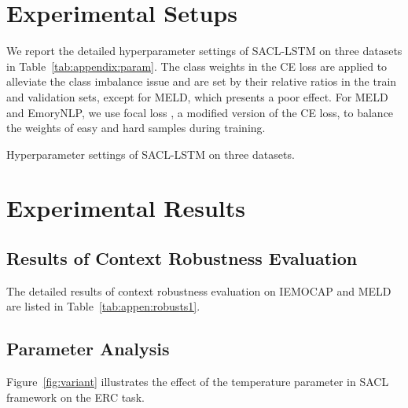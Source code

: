 \documentclass[11pt]{article}
\begin{document}
\section{Experimental Setups}  \label{sec:appendix:setups}
We report the detailed hyperparameter settings of SACL-LSTM on three datasets in Table~\ref{tab:appendix:param}.
The class weights in the CE loss are applied to alleviate the class imbalance issue and are set by their relative ratios in the train and validation sets, except for MELD, which presents a poor effect.
For MELD and EmoryNLP, we use focal loss \citep{DBLP:conf/iccv/LinGGHD17}, a modified version of the CE loss, to balance the weights of easy and hard samples during training.

\begin{table}[t]
\centering
{}
\caption{Hyperparameter settings of SACL-LSTM
on three datasets.
}
\label{tab:appendix:param}
\end{table} 

\section{Experimental Results}
\subsection{Results of Context Robustness Evaluation} \label{sec:app:robust}
The detailed results of context robustness evaluation on IEMOCAP and MELD are listed in Table~\ref{tab:appen:robusts1}.

\subsection{Parameter Analysis}
\label{sec:variant}
Figure~\ref{fig:variant} illustrates the effect of the temperature parameter in SACL framework on the ERC task.
\end{document}
